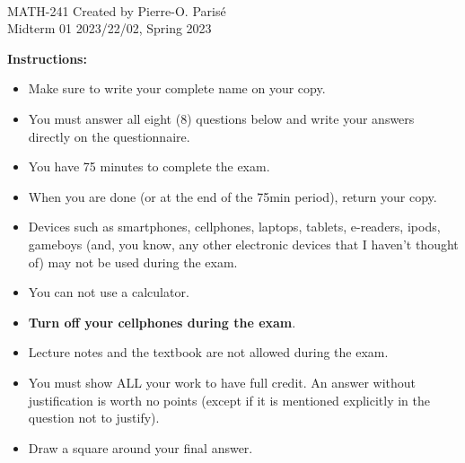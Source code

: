 \documentclass[addpoints, 12pt]{exam}%
\theoremstyle{definition}
\begin{document}
	\noindent \hrulefill \\
	\noindent MATH-241 \hfill Created by Pierre-O. Paris{\'e}\\
	Midterm 01 \hfill 2023/22/02, Spring 2023\\\vspace*{-0.7cm}

\noindent\hrulefill
	
\vspace*{1cm}

\noindent{}

\vspace*{0.5cm}

\noindent{}

\vspace*{0.5cm}

\noindent{}

\vspace*{1cm}

\noindent\textbf{Instructions:} 

\begin{itemize}
\item Make sure to write your complete name on your copy. 
\item You must answer all eight (8) questions below and write your answers directly on the questionnaire.
\item You have 75 minutes to complete the exam.
\item When you are done (or at the end of the 75min period), return your copy. 
\item Devices such as smartphones, cellphones, laptops, tablets, e-readers, ipods, gameboys (and, you know, any other electronic devices that I haven't thought of) may not be used during the exam. 
\item You can not use a calculator.
\item \textbf{Turn off your cellphones during the exam}.
\item Lecture notes and the textbook are not allowed during the exam. 
\item You must show ALL your work to have full credit. An answer without justification is worth no points (except if it is mentioned explicitly in the question not to justify).
\item Draw a square around your final answer.
\end{itemize}
\end{document}
